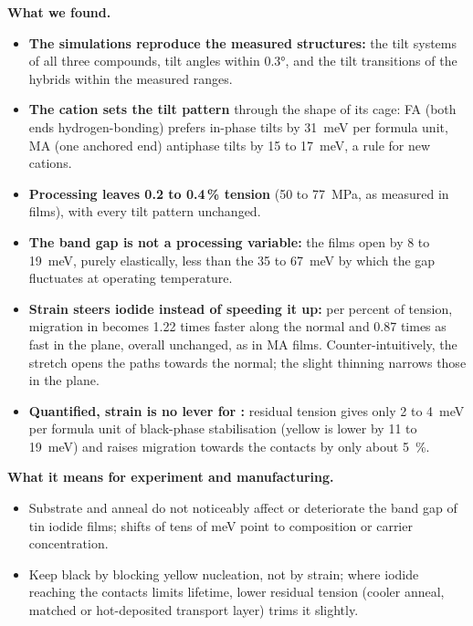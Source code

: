 \begin{tcolorbox}[colback=boxbg, colframe=boxframe, boxrule=0.8pt, arc=2pt, left=8pt, right=8pt, top=6pt, bottom=6pt,
  title={\textbf{At a glance}}, fonttitle=\large, coltitle=white]
\textbf{What we found.}
\begin{itemize}[leftmargin=12pt, itemsep=0pt, topsep=1pt]
  \item \textbf{The simulations reproduce the measured structures:} the tilt systems of all three compounds, tilt angles
    within \ang{0.3}, and the tilt transitions of the hybrids within the measured ranges.
  \item \textbf{The cation sets the tilt pattern} through the shape of its cage: FA (both ends hydrogen-bonding) prefers
    in-phase tilts by \SI{31}{meV} per formula unit, MA (one anchored end) antiphase tilts by 15 to \SI{17}{meV}, a rule for new cations.
  \item \textbf{Processing leaves 0.2 to 0.4\,\% tension} (50 to \SI{77}{MPa}, as measured in films), with every tilt pattern unchanged.
  \item \textbf{The band gap is not a processing variable:} the films open by 8 to \SI{19}{meV}, purely elastically,
    less than the 35 to \SI{67}{meV} by which the gap fluctuates at operating temperature.
  \item \textbf{Strain steers iodide instead of speeding it up:} per percent of tension, migration in \CsSnI{} becomes
    1.22 times faster along the normal and 0.87 times as fast in the plane, overall unchanged, as in MA films.
    Counter-intuitively, the stretch opens the paths towards the normal; the slight thinning narrows those in the plane.

  \item \textbf{Quantified, strain is no lever for \CsSnI{}:} residual tension gives only 2 to \SI{4}{meV} per
    formula unit of black-phase stabilisation (yellow is lower by 11 to \SI{19}{meV}) and raises migration towards the
    contacts by only about \SI{5}{\percent}.
\end{itemize}

\textbf{What it means for experiment and manufacturing.}
\begin{itemize}[leftmargin=12pt, itemsep=0pt, topsep=1pt]
  \item Substrate and anneal do not noticeably affect or deteriorate the band gap of tin iodide films; shifts of tens of meV point to
    composition or carrier concentration.
  \item Keep \CsSnI{} black by blocking yellow nucleation, not by strain; where iodide reaching the contacts limits
    lifetime, lower residual tension (cooler anneal, matched or hot-deposited transport layer) trims it slightly.
\end{itemize}


\end{tcolorbox}
